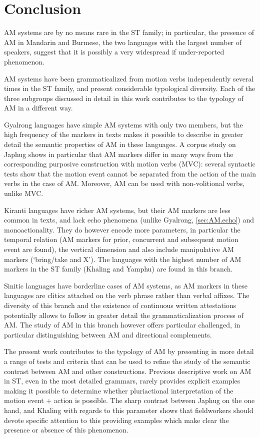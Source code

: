 \documentclass[oneside,a4paper,11pt]{article}
\begin{document}
\section{Conclusion}
AM systems are by no means rare in the ST family; in particular, the presence of AM in Mandarin and Burmese, the two languages with the largest number of speakers, suggest that it is possibly a very widespread if under-reported phenomenon.

AM systems have been grammaticalized from motion verbs independently several times in the ST family, and present considerable typological diversity. Each of the three subgroups discussed in detail in this work contributes to the typology of AM in a different way.

Gyalrong languages have simple AM systems with only two members, but the high frequency of the markers in texts makes it possible to describe in greater detail the semantic properties of AM in these languages. A corpus study on Japhug shows in particular that AM markers differ in many ways from the corresponding purposive construction with motion verbs (MVC): several syntactic tests show that the motion event cannot be separated from the action of the main verbs in the case of AM. Moreover, AM can be used with non-volitional verbs, unlike MVC.

Kiranti languages have richer AM systems, but their AM markers are less common in texts, and lack echo phenomena (unlike Gyalrong, \ref{sec:AM.echo}) and monoactionality. They do however encode more parameters, in particular the temporal relation (AM markers for prior, concurrent and subsequent motion event are found), the vertical dimension and also include manipulative AM markers (`bring/take and X'). The languages with the highest number of AM markers in the ST family (Khaling and Yamphu) are found in this branch.

Sinitic languages have borderline cases of AM systems, as AM markers in these languages are clitics attached on the verb phrase rather than verbal affixes. The diversity of this branch and the existence of continuous written attestations potentially allows to follow in greater detail the grammaticalization process of AM. The study of AM in this branch however offers particular challenged, in particular distinguishing between AM and directional complements.

The present work contributes to the typology of AM by presenting in more detail a range of tests and criteria that can be used to refine the study of the semantic contrast between AM and other constructions. Previous descriptive work on AM in ST, even in the most detailed grammars, rarely provides explicit examples making it possible to determine whether pluriactional interpretation of the motion event + action is possible. The sharp contrast between Japhug on the one hand, and Khaling with regards to this parameter shows that fieldworkers should devote specific attention to this providing examples which make clear the presence or absence of this phenomenon.




 
\end{document}
